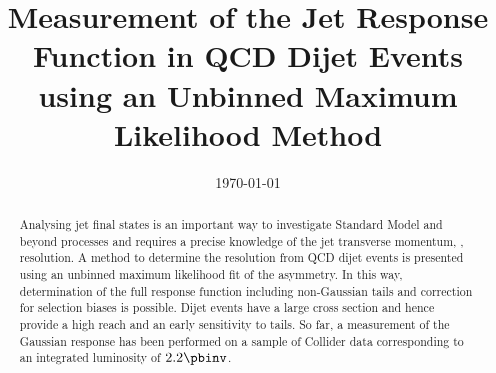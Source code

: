 \documentclass[a4paper]{cmspaper} %
\begin{document}
\begin{titlepage}
  \date{\today}
  \title{Measurement of the Jet \pt Response Function in QCD Dijet
    Events using an Unbinned Maximum Likelihood Method}
  \begin{abstract}
    Analysing jet final states is an important way to investigate
    Standard Model and beyond processes and requires a precise
    knowledge of the jet transverse momentum, \pt, resolution.	
    A method to determine the resolution from QCD dijet
    events is presented using an unbinned maximum
    likelihood fit of the \pt asymmetry.
    In this way, determination of the full response function including non-Gaussian
    tails and correction for selection biases is possible.
    Dijet events have a large cross section and hence provide a
    high \pt reach and an early sensitivity to tails.
    So far, a measurement of the Gaussian response has been performed
    on a sample of Collider data corresponding to an integrated luminosity of $2.2\pbinv$.
  \end{abstract}
\end{titlepage}
\tableofcontents












\end{document}

